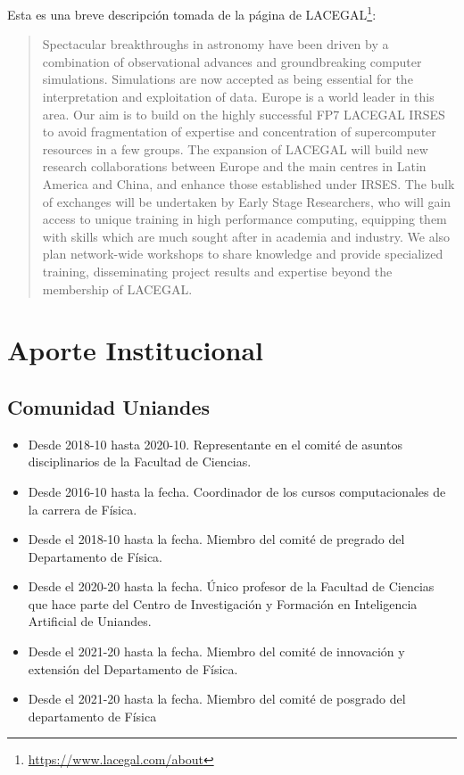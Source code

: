 \documentclass{article}
\begin{document}
\begin{itemize}
Esta es una breve descripci\'on tomada de la p\'agina de LACEGAL\footnote{\url{https://www.lacegal.com/about}}:
\begin{quote}
Spectacular breakthroughs in astronomy have been driven by a combination of observational advances and groundbreaking computer simulations. Simulations are now accepted as being essential for the interpretation and exploitation of data. Europe is a world leader in this area. Our aim is to build on the highly successful FP7 LACEGAL IRSES to avoid fragmentation of expertise and concentration of supercomputer resources in a few groups. The expansion of LACEGAL will build new research collaborations between Europe and the main centres in Latin America and China, and enhance those established under IRSES. The bulk of exchanges will be undertaken by Early Stage Researchers, who will gain access to unique training in high performance computing, equipping them with skills which are much sought after in academia and industry. We also plan network-wide workshops to share knowledge and provide specialized training, disseminating project results and expertise beyond the membership of LACEGAL.
\end{quote}
\end{itemize}



\newpage
\section{Aporte Institucional}


\subsection{Comunidad Uniandes}
\begin{itemize}
\item {Desde 2018-10 hasta 2020-10. Representante en el comit\'e de asuntos disciplinarios de la Facultad de Ciencias.}
\item {Desde 2016-10 hasta la fecha. Coordinador de los cursos computacionales de la carrera de
  F\'isica.} 
\item {Desde el 2018-10 hasta la fecha. Miembro del comit\'e de pregrado del Departamento de F\'isica.}
\item {Desde el 2020-20 hasta la fecha. \'Unico profesor de la Facultad de Ciencias que hace parte del Centro de Investigaci\'on y Formaci\'on en Inteligencia Artificial de Uniandes.}
\item {Desde el 2021-20 hasta la fecha. Miembro del comit\'e de innovaci\'on y extensi\'on del Departamento de F\'isica.}
\item {Desde el 2021-20 hasta la fecha. Miembro del comit\'e de posgrado del departamento de F\'isica}
\end{itemize}
\end{document}
